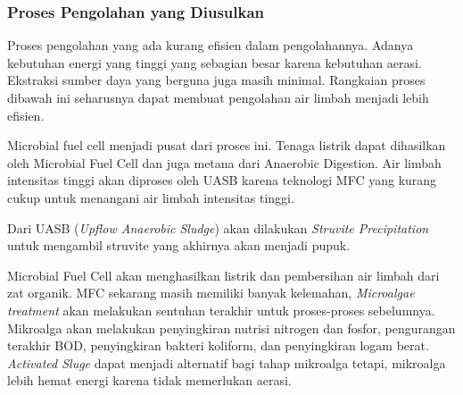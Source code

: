 \documentclass[10pt,a4paper,hidelinks]{article}
\begin{document}
    \subsubsection{Proses Pengolahan yang Diusulkan}
    Proses pengolahan yang ada kurang efisien dalam pengolahannya. Adanya kebutuhan energi yang tinggi yang sebagian besar karena kebutuhan aerasi. Ekstraksi sumber daya yang berguna juga masih minimal. Rangkaian proses dibawah ini seharusnya dapat membuat pengolahan air limbah menjadi lebih efisien.
    \begin{center}
    \end{center}
    Microbial fuel cell menjadi pusat dari proses ini. Tenaga listrik dapat dihasilkan oleh Microbial Fuel Cell dan juga metana dari Anaerobic Digestion. Air limbah intensitas tinggi akan diproses oleh UASB karena teknologi MFC yang kurang cukup untuk menangani air limbah intensitas tinggi.
    
    
    Dari UASB (\textit{Upflow Anaerobic Sludge}) akan dilakukan \textit{Struvite Precipitation} untuk mengambil struvite yang akhirnya akan menjadi pupuk.
    
    
    Microbial Fuel Cell akan menghasilkan listrik dan pembersihan air limbah dari zat organik. MFC sekarang masih memiliki banyak kelemahan, \textit{Microalgae treatment} akan melakukan sentuhan terakhir untuk proses-proses sebelumnya. Mikroalga akan melakukan penyingkiran nutrisi nitrogen dan fosfor, pengurangan terakhir BOD, penyingkiran bakteri koliform, dan penyingkiran logam berat. \textit{Activated Sluge} dapat menjadi alternatif bagi tahap mikroalga tetapi, mikroalga lebih hemat energi karena tidak memerlukan aerasi.
    
\end{document}
